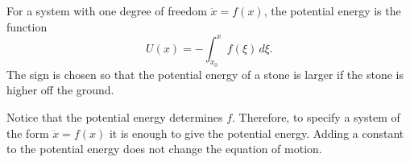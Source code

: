 For a system with one degree of freedom $\ddot{x} = f(x)$, the potential energy is the function
$$U(x) = -\int_{x_0}^{x} f(\xi) \, d\xi.$$
The sign is chosen so that the potential energy of a stone is larger if the stone is higher off the ground.

Notice that the potential energy determines $f$. Therefore, to specify a system of the form $\ddot{x} = f(x)$ it is enough to give the potential energy. Adding a constant to the potential energy does not change the equation of motion.
